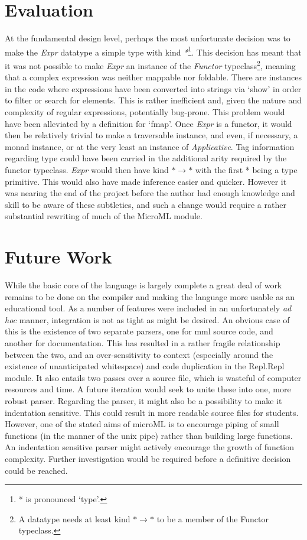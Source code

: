 \documentclass[12pt, a4paper]{report}
\begin{document}
\section{Evaluation}
At the fundamental design level, perhaps the most unfortunate decision was to make the \textit{Expr}
datatype a simple type with kind \textit{*}\footnote{* is pronounced `type'.}. This decision
has meant that it was not possible to make \textit{Expr} an instance of the \textit{Functor}
typeclass\footnote{A datatype needs at least kind $* \rightarrow *$ to be a member of the
Functor typeclass.}, meaning that a complex expression was neither mappable nor foldable. There are
instances in the code where expressions have been converted into strings via `show' in order to
filter or search for elements. This is rather inefficient and, given the nature and complexity
of regular expressions, potentially bug-prone. This problem would have been alleviated by a
definition for `fmap'. Once \textit{Expr} is a functor, it would then be relatively trivial to make
a traversable instance, and even, if necessary, a monad instance, or at the very least an instance of
\textit{Applicative}. Tag information regarding type could have been carried in the additional arity
required by the functor typeclass. \textit{Expr} would then have kind $* \rightarrow *$ with the
first * being a type primitive. This would also have made inference easier and quicker. However it was
nearing the end of the project before the author had enough knowledge and skill to be aware of these
subtleties, and such a change would require a rather substantial rewriting of much of the MicroML
module.

\section{Future Work}
While the basic core of the language is largely complete a great deal of work remains to be done on
the compiler and making the language more usable as an educational tool. As a number of features
were included in an unfortunately \textit{ad hoc} manner, integration is not as tight as might be
desired. An obvious case of this is the existence of two separate parsers, one for mml source code,
and another for documentation. This has resulted in a rather fragile relationship between the two,
and an over-sensitivity to context (especially around the existence of unanticipated whitespace)
and code duplication in the Repl.Repl module. It also entails two passes over a source file, which
is wasteful of computer resources and time. A future iteration would seek to unite these into one,
more robust parser. Regarding the parser, it might also be a possibility to make it indentation
sensitive. This could result in more readable source files for students. However, one of the stated
aims of microML is to encourage piping of small functions (in the manner of the unix pipe) rather
than building large functions. An indentation sensitive parser might actively encourage the growth
of function complexity. Further investigation would be required before a definitive decision could
be reached.
\end{document}
